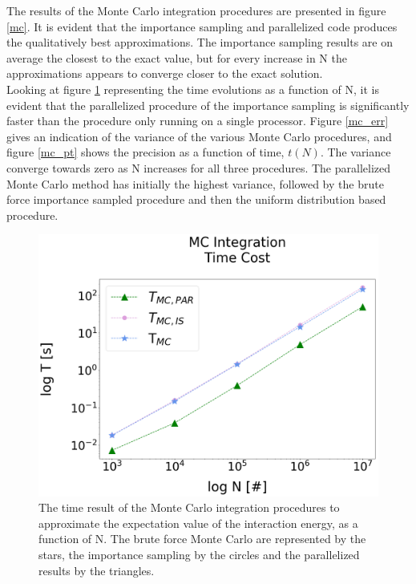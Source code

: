 \documentclass[%
reprint,
amsmath,amssymb,
aps,
]{revtex4-1}
\begin{document}
\newpage 
\twocolumngrid
The results of the Monte Carlo integration procedures are presented in figure \ref{mc}. It is evident that the importance sampling and parallelized code produces the qualitatively best approximations. The importance sampling results are on average the closest to the exact value, but for every increase in N the approximations appears to converge closer to the exact solution.  \\  \indent 
Looking at figure \ref{mc_time} representing the time evolutions as a function of N, it is evident that the parallelized procedure of the importance sampling is significantly faster than the procedure only running on a single  processor.  Figure \ref{mc_err} gives an indication of the variance of the various Monte Carlo procedures, and figure \ref{mc_pt} shows the precision as a function of time, $t(N)$. The variance converge towards zero as N increases for all three procedures. The parallelized Monte Carlo method has initially the highest variance, followed by the brute force importance sampled procedure and then the uniform distribution based procedure. 
\\ \newpage 
\begin{figure}[H]
	\includegraphics[scale = 0.2]{MC_time.png}
	\caption{\label{mc_time} The time result of the Monte Carlo integration procedures to approximate the expectation value of the interaction energy, as a function of N. The brute force Monte Carlo are represented by the stars, the importance sampling by the circles and the parallelized results by the triangles. }
\end{figure} 
\end{document}
